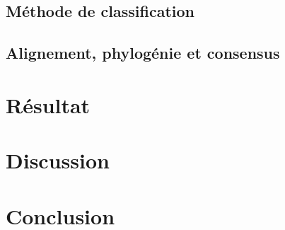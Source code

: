 \documentclass[12pt,a4paper]{article}
\begin{document}
 
 
\subsection{Méthode de classification}
\subsection{Alignement, phylogénie et consensus}
\section{Résultat}
\section{Discussion}
\section{Conclusion}


%
% 
%
%
%
% 
% 
\end{document}
